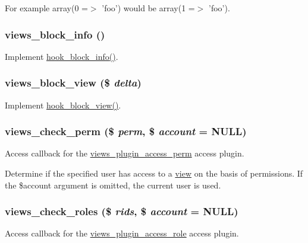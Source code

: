 For example array(0 =$>$ 'foo') would be array(1 =$>$ 'foo'). \hypertarget{views_8module_a394aa81d1c40be16ebc29acb2fdae0fc}{
\subsubsection[{views\_\-block\_\-info}]{\setlength{\rightskip}{0pt plus 5cm}views\_\-block\_\-info ()}}
\label{views_8module_a394aa81d1c40be16ebc29acb2fdae0fc}
Implement \hyperlink{group__hooks_ga2bd926c3e90deeba0c3ba64fb3c64d73}{hook\_\-block\_\-info()}. \hypertarget{views_8module_ae2b10c93b6c54fb61100759aed3b7299}{
\subsubsection[{views\_\-block\_\-view}]{\setlength{\rightskip}{0pt plus 5cm}views\_\-block\_\-view (\$ {\em delta})}}
\label{views_8module_ae2b10c93b6c54fb61100759aed3b7299}
Implement \hyperlink{group__hooks_gaa14092a3e74cdc57aa295100cfd6860d}{hook\_\-block\_\-view()}. \hypertarget{views_8module_aa76091b45e7d90275a77906611361832}{
\subsubsection[{views\_\-check\_\-perm}]{\setlength{\rightskip}{0pt plus 5cm}views\_\-check\_\-perm (\$ {\em perm}, \/  \$ {\em account} = {\ttfamily NULL})}}
\label{views_8module_aa76091b45e7d90275a77906611361832}
Access callback for the \hyperlink{classviews__plugin__access__perm}{views\_\-plugin\_\-access\_\-perm} access plugin.

Determine if the specified user has access to a \hyperlink{classview}{view} on the basis of permissions. If the \$account argument is omitted, the current user is used. \hypertarget{views_8module_aff4ad7e99455055e33d13bc6394bea69}{
\subsubsection[{views\_\-check\_\-roles}]{\setlength{\rightskip}{0pt plus 5cm}views\_\-check\_\-roles (\$ {\em rids}, \/  \$ {\em account} = {\ttfamily NULL})}}
\label{views_8module_aff4ad7e99455055e33d13bc6394bea69}
Access callback for the \hyperlink{classviews__plugin__access__role}{views\_\-plugin\_\-access\_\-role} access plugin.

